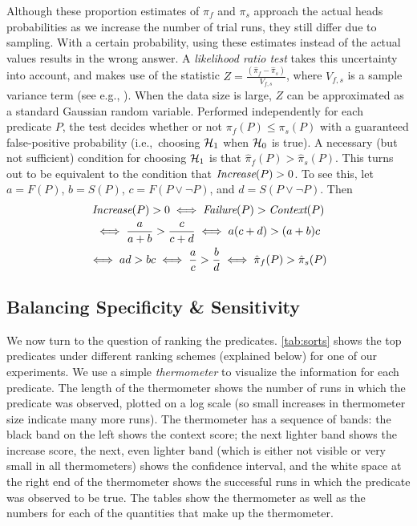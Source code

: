 Although these proportion estimates of $\pi_f$ and $\pi_s$ approach the
actual heads probabilities as we increase the number of trial runs, they
still differ due to sampling.  With a certain probability, using these
estimates instead of the actual values results in the wrong
answer.  A \textit{likelihood ratio test} takes this uncertainty into
account, and makes use of the statistic $ Z = \frac{(\hat \pi_f - \hat
  \pi_s)}{V_{f,s}}$, where $V_{f,s}$ is a sample variance term (see
e.g., \cite{Lehmann:1986:hyptest}).  When
the data size is large, $Z$ can be approximated as a standard Gaussian
random variable.  Performed independently for each predicate $P$, the
test decides whether or not $\pi_f(P) \leq \pi_s(P)$ with a guaranteed
false-positive probability (i.e.,\ choosing ${\mathcal{H}}_1$ when ${\mathcal{H}}_0$ is true).
A necessary (but not sufficient) condition for choosing ${\mathcal{H}}_1$ is that
$\hat \pi_f(P) > \hat \pi_s(P)$.  This turns out to be
equivalent to the condition that $\textit{Increase}(P) > 0$.  To see this,
let $a = F(P)$, $b = S(P)$, $c = F(P\lor\lnot P)$, and $d = S(P\lor\lnot P)$.
Then
\begin{gather*}
  \textit{Increase}(P) > 0 \iff \textit{Failure}(P) > \textit{Context}(P) \\
  \iff \frac{a}{a+b} > \frac{c}{c+d}
  \iff a (c+d) > (a+b) c \\
  \iff ad > bc \iff \frac{a}{c} > \frac{b}{d}
  \iff \hat \pi_f(P) > \hat \pi_s(P)
\end{gather*}



\subsection{Balancing Specificity \& Sensitivity}
\label{sec:ranking}

We now turn to the question of ranking the predicates.
\autoref{tab:sorts} shows the top
predicates under different ranking schemes (explained below) for one of our
experiments.  We use
a simple {\em thermometer} to visualize the information for each
predicate.  The length of the thermometer shows the number of runs in
which the predicate was observed, plotted on a log scale (so small increases
in thermometer size indicate many more runs).  The thermometer has
a sequence of bands:
the black band on the left shows the context score;
the next lighter band shows the increase score, the next, even  lighter band (which is either not
visible or very small in all thermometers) shows the confidence
interval, and the white space at the right end of the thermometer
shows the successful runs in which the predicate was
observed to be true.  The tables show the thermometer as well as the
numbers for each of the quantities that make up the thermometer. 

